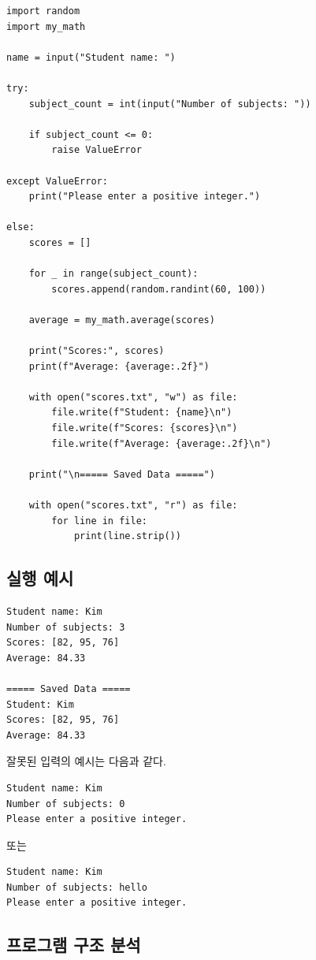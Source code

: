 \documentclass[11pt,a4paper]{article}
\begin{document}
\begin{lstlisting}
import random
import my_math

name = input("Student name: ")

try:
    subject_count = int(input("Number of subjects: "))

    if subject_count <= 0:
        raise ValueError

except ValueError:
    print("Please enter a positive integer.")

else:
    scores = []

    for _ in range(subject_count):
        scores.append(random.randint(60, 100))

    average = my_math.average(scores)

    print("Scores:", scores)
    print(f"Average: {average:.2f}")

    with open("scores.txt", "w") as file:
        file.write(f"Student: {name}\n")
        file.write(f"Scores: {scores}\n")
        file.write(f"Average: {average:.2f}\n")

    print("\n===== Saved Data =====")

    with open("scores.txt", "r") as file:
        for line in file:
            print(line.strip())
\end{lstlisting}

\subsection{실행 예시}

\begin{verbatim}
Student name: Kim
Number of subjects: 3
Scores: [82, 95, 76]
Average: 84.33

===== Saved Data =====
Student: Kim
Scores: [82, 95, 76]
Average: 84.33
\end{verbatim}

잘못된 입력의 예시는 다음과 같다.

\begin{verbatim}
Student name: Kim
Number of subjects: 0
Please enter a positive integer.
\end{verbatim}

또는

\begin{verbatim}
Student name: Kim
Number of subjects: hello
Please enter a positive integer.
\end{verbatim}

\subsection{프로그램 구조 분석}
\end{document}
